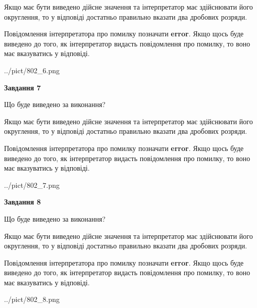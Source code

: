 \documentclass[12pt, ukrainian]{article}
\begin{document}
{\begin {Large}
Якщо має бути виведено дійсне значення та інтерпретатор має здійснювати його округлення, 
то у відповіді достатньо правильно вказати два дробових розряди.

Повідомлення інтерпретатора про помилку позначати \textbf{error}.
Якщо щось буде виведено до того, як інтерпретатор видасть повідомлення про помилку, 
то воно має вказуватись у відповіді. \par

\begin{center}
	{../pict/802_6.png}
\end{center}
\newpage

{\begin {center}\textbf{Завдання 7}\end {center}}\par
Що буде виведено за виконання? \par

Якщо має бути виведено дійсне значення та інтерпретатор має здійснювати його округлення, 
то у відповіді достатньо правильно вказати два дробових розряди.

Повідомлення інтерпретатора про помилку позначати \textbf{error}.
Якщо щось буде виведено до того, як інтерпретатор видасть повідомлення про помилку, 
то воно має вказуватись у відповіді. \par

\begin{center}
	{../pict/802_7.png}
\end{center}
\newpage

{\begin {center}\textbf{Завдання 8}\end {center}}\par
Що буде виведено за виконання? \par

Якщо має бути виведено дійсне значення та інтерпретатор має здійснювати його округлення, 
то у відповіді достатньо правильно вказати два дробових розряди.

Повідомлення інтерпретатора про помилку позначати \textbf{error}.
Якщо щось буде виведено до того, як інтерпретатор видасть повідомлення про помилку, 
то воно має вказуватись у відповіді. \par

\begin{center}
	{../pict/802_8.png}
\end{center}
\newpage


\end{Large}}
\end{document}
